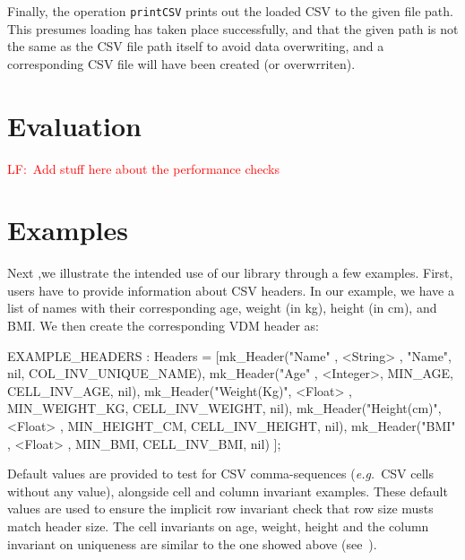 \documentclass[runningheads,a4paper]{llncs}
\newcommand{\lfcomment}[1]{{\scriptsize\textcolor{red}{LF:~#1}}}  %
\begin{document}
Finally, the operation \texttt{printCSV} prints out the loaded CSV to the given file path. This presumes loading has taken place successfully, and that the given path is not the same as the CSV file path itself to avoid data overwriting, and a corresponding CSV file will have been created (or overwrriten).  

\section{Evaluation}\label{sec:Evaluation}

\lfcomment{Add stuff here about the performance checks}

\section{Examples}\label{sec:Examples}

Next ,we illustrate the intended use of our library through a few examples. First, users have to provide information about CSV headers. In our example, we have a list of names with their corresponding age, weight (in kg), height (in cm), and BMI. We then create the corresponding VDM header as:
%
\begin{vdmsl}[frame=none,basicstyle=\ttfamily\scriptsize]
	EXAMPLE_HEADERS : Headers = 
        [mk_Header("Name"      , <String> ,  "Name", nil, COL_INV_UNIQUE_NAME),
         mk_Header("Age"       , <Integer>,       MIN_AGE, CELL_INV_AGE, nil),
         mk_Header("Weight(Kg)", <Float>  , MIN_WEIGHT_KG, CELL_INV_WEIGHT, nil),
         mk_Header("Height(cm)", <Float>  , MIN_HEIGHT_CM, CELL_INV_HEIGHT, nil),
         mk_Header("BMI"       , <Float>  ,       MIN_BMI, CELL_INV_BMI, nil) ];
\end{vdmsl} 
%
Default values are provided to test for CSV comma-sequences (\textit{e.g.}~CSV cells without any value), alongside cell and column invariant examples. These default values are used to ensure the implicit row invariant check that row size musts match header size. The cell invariants on age, weight, height and the column invariant on uniqueness are similar to the one showed above (see~).
\end{document}
